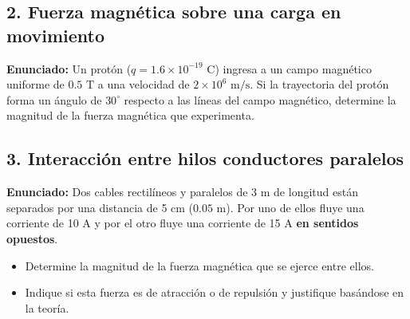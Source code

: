 \documentclass[12pt, letterpaper]{article}
\begin{document}
\subsection*{2. Fuerza magnética sobre una carga en movimiento}
\noindent \textbf{Enunciado:} Un protón ($q = 1.6 \times 10^{-19} \text{ C}$) ingresa a un campo magnético uniforme de $0.5 \text{ T}$ a una velocidad de $2 \times 10^6 \text{ m/s}$. Si la trayectoria del protón forma un ángulo de $30^\circ$ respecto a las líneas del campo magnético, determine la magnitud de la fuerza magnética que experimenta.


\subsection*{3. Interacción entre hilos conductores paralelos}
\noindent \textbf{Enunciado:} Dos cables rectilíneos y paralelos de 3 m de longitud están separados por una distancia de 5 cm ($0.05$ m). Por uno de ellos fluye una corriente de 10 A y por el otro fluye una corriente de 15 A \textbf{en sentidos opuestos}. 
\begin{itemize}
	\item[a.] Determine la magnitud de la fuerza magnética que se ejerce entre ellos.
	\item[b.] Indique si esta fuerza es de atracción o de repulsión y justifique basándose en la teoría.
\end{itemize}
\end{document}
